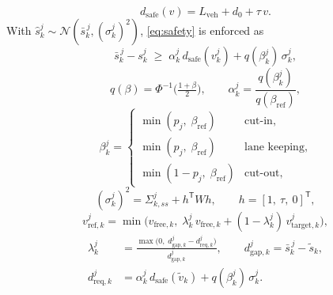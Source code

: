 \documentclass[letterpaper, 10 pt, journal]{IEEEtran}
\begin{document}
\begin{equation}
    d_{\mathrm{safe}}(v) = L_{\mathrm{veh}} + d_0 + \tau\, v .
    \label{eq:dsafe}
\end{equation}
With $\hat s^j_k \sim \mathcal{N}(\bar s^{\,j}_k, (\sigma^j_k)^2)$, \eqref{eq:safety} is enforced as
\begin{equation}
    \bar s^{\,j}_k - s^j_k \;\ge\; \alpha^j_k\, d_{\mathrm{safe}}(v^j_k) + q(\beta^j_k)\,\sigma^j_k,
    \label{eq:safety_det}
\end{equation}
\begin{equation}
    q(\beta) = \Phi^{-1}\!\Big(\tfrac{1+\beta}{2}\Big), \qquad
    \alpha^j_k = \frac{q(\beta^j_k)}{q(\beta_{\mathrm{ref}})},
    \label{eq:alpha}
\end{equation}
\begin{equation}
    \beta^j_k =
    \begin{cases}
        \min(p_j,\; \beta_{\mathrm{ref}}) & \text{cut-in}, \\
        \min(p_j,\; \beta_{\mathrm{ref}}) & \text{lane keeping}, \\
        \min(1 - p_j,\; \beta_{\mathrm{ref}}) & \text{cut-out},
    \end{cases}
    \label{eq:beta}
\end{equation}
\begin{equation}
    (\sigma^j_k)^2 = \Sigma^{j}_{k,ss} + h^\mathsf{T} W h, \qquad
    h = [1,\ \tau,\ 0]^\mathsf{T},
    \label{eq:sigma}
\end{equation}
\begin{equation}
    v^j_{\mathrm{ref},k} = \min\!\big(v_{\mathrm{free},k},\;
    \lambda^j_k\, v_{\mathrm{free},k} + (1-\lambda^j_k)\, v^j_{\mathrm{target},k}\big),
    \label{eq:vref}
\end{equation}
\begin{equation}
\begin{aligned}
    \lambda^j_k &= \frac{\max\!\big(0,\; d^j_{\mathrm{gap},k} - d^j_{\mathrm{req},k}\big)}{d^j_{\mathrm{gap},k}},
    \qquad d^j_{\mathrm{gap},k} = \bar s^{\,j}_k - \tilde s_k, \\
    d^j_{\mathrm{req},k} &= \alpha^j_k\, d_{\mathrm{safe}}(\tilde v_k) + q(\beta^j_k)\,\sigma^j_k .
\end{aligned}
\label{eq:vref_blend}
\end{equation}
\end{document}
